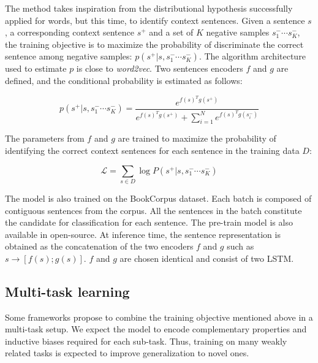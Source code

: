The method takes inspiration from the distributional hypothesis successfully applied for words, but this time, to identify context sentences. Given a sentence $s$, a corresponding context sentence $s^+$ and a set of $K$ negative samples $s^-_1 \cdots s^-_K$, the training objective is to maximize the probability of discriminate the correct sentence among negative samples: $p(s^+ | s, s^-_1 \cdots s^-_K)$. The algorithm architecture used to estimate $p$ is close to \textsl{word2vec}. Two sentences encoders $f$ and $g$ are defined, and the conditional probability is estimated as follows:


\begin{equation*}
    p(s^+ | s, s^-_1 \cdots s^-_K) = \frac{e^{f(s)^Tg(s^+)}}{e^{f(s)^Tg(s^+)}+\sum_{i=1}^Ne^{f(s)^Tg(s^-_i)}}    
\end{equation*}

The parameters from $f$ and $g$ are trained to maximize the probability of identifying the correct context sentences for each sentence in the training data $D$:

\begin{equation*}
    \mathcal{L} = \sum_{s \in D} \log P(s^+ | s, s^-_1 \cdots s^-_K)
\end{equation*}


The model is also trained on the BookCorpus dataset. Each batch is composed of contiguous sentences from the corpus. All the sentences in the batch constitute the candidate for classification for each sentence. The pre-train model is also available in open-source. At inference time, the sentence representation is obtained as the concatenation of the two encoders $f$ and $g$ such as $s \rightarrow [f(s);g(s)]$. $f$ and $g$ are chosen identical and consist of two LSTM. 


\subsection{Multi-task learning}

Some frameworks propose to combine the training objective mentioned above in a multi-task setup. We expect the model to encode complementary properties and inductive biases required for each sub-task. Thus, training on many weakly related tasks is expected to improve generalization to novel ones.

